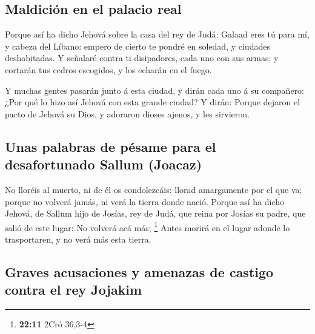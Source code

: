 \hypertarget{maldiciuxf3n-en-el-palacio-real}{%
\subsection{Maldición en el palacio
real}\label{maldiciuxf3n-en-el-palacio-real}}

 Porque así ha dicho Jehová sobre la casa del rey de Judá:
Galaad eres tú para mí, y cabeza del Líbano: empero de cierto te pondré
en soledad, y ciudades deshabitadas.  Y señalaré contra ti
disipadores, cada uno con sus armas; y cortarán tus cedros escogidos, y
los echarán en el fuego.

 Y muchas gentes pasarán junto á esta ciudad, y dirán cada
uno á su compañero: ¿Por qué lo hizo así Jehová con esta grande ciudad?
 Y dirán: Porque dejaron el pacto de Jehová su Dios, y
adoraron dioses ajenos, y les sirvieron.

\hypertarget{unas-palabras-de-puxe9same-para-el-desafortunado-sallum-joacaz}{%
\subsection{Unas palabras de pésame para el desafortunado Sallum
(Joacaz)}\label{unas-palabras-de-puxe9same-para-el-desafortunado-sallum-joacaz}}

 No lloréis al muerto, ni de él os condolezcáis: llorad
amargamente por el que va; porque no volverá jamás, ni verá la tierra
donde nació.  Porque así ha dicho Jehová, de Sallum hijo
de Josías, rey de Judá, que reina por Josías su padre, que salió de este
lugar: No volverá acá más; \footnote{\textbf{22:11} 2Cró 36,3-4}
 Antes morirá en el lugar adonde lo trasportaren, y no
verá más esta tierra.

\hypertarget{graves-acusaciones-y-amenazas-de-castigo-contra-el-rey-jojakim}{%
\subsection{Graves acusaciones y amenazas de castigo contra el rey
Jojakim}\label{graves-acusaciones-y-amenazas-de-castigo-contra-el-rey-jojakim}}


